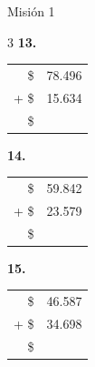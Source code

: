 \documentclass[12pt, letterpaper]{article}
\newcommand{\boxfill}[1][1.2cm]{\tcbox[on line, size=minimal, colframe=valdark!80, colback=white, boxrule=0.5pt, arc=1mm, boxsep=2pt, left=2pt, right=2pt, top=2pt, bottom=2pt]{\makebox[#1]{\vphantom{M}}}}
\begin{document}
\begin{practica}{Misión 1}
\vspace{0.6cm}
\begin{multicols}{3}
    \textbf{13.}\\
    \begin{tabular}{rr}
      \$ & 78.496 \\
    + \$ & 15.634 \\
    \hline
      \$ & \boxfill[1.8cm]
    \end{tabular}

    \textbf{14.}\\
    \begin{tabular}{rr}
      \$ & 59.842 \\
    + \$ & 23.579 \\
    \hline
      \$ & \boxfill[1.8cm]
    \end{tabular}

    \textbf{15.}\\
    \begin{tabular}{rr}
      \$ & 46.587 \\
    + \$ & 34.698 \\
    \hline
      \$ & \boxfill[1.8cm]
    \end{tabular}
\end{multicols}
\end{practica}

\end{document}
